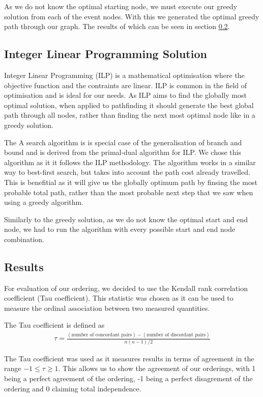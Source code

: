 \documentclass[bsc,frontabs,twoside,singlespacing,parskip,deptreport]{infthesis}     %
\begin{document}
As we do not know the optimal starting node, we must execute our greedy solution from each of the event nodes.
With this we generated the optimal greedy path through our graph. The results of which can be seen in section \ref{sec:graph-results}.

\subsection{Integer Linear Programming Solution}
Integer Linear Programming (ILP) is a mathematical optimisation where the objective function and the contraints are linear.
ILP is common in the field of optimisation and is ideal for our needs. As ILP aims to find the globally most optimal solution, when applied to pathfinding it
should generate the best global path through all nodes, rather than finding the next most optimal node like in a greedy solution.


The A\* search algorithm is is special case of the generalisation of branch and bound\cite{balas1983branch} and is derived from the primal-dual algorithm for ILP\cite{ye2012note}.
We chose this algorithm as it it follows the ILP methodology. The algorithm works in a similar way to best-first search, but takes into account the path cost already travelled.
This is benefitial as it will give us the globally optimum path by finsing the most probable total path, rather than the most probable next step that we saw when using a
greedy algorithm.

Similarly to the greedy solution, as we do not know the optimal start and end node, we had to run the algorithm with every possible start and end node combination.

\subsection{Results}\label{sec:graph-results}
For evaluation of our ordering, we decided to use the Kendall rank correlation coefficient (Tau coefficient).
This statistic was chosen as it can be used to measure the ordinal association between two measured quantities.


The Tau coefficient is defined as
\begin{eqnarray}
  \tau=\frac{(\text{number of concordant pairs})-(\text{number of discordant pairs})}{n(n-1)/2}\nonumber
\end{eqnarray}\cite{abdi2007kendall}

The Tau coefficient was used as it measures results in terms of agreement in the range $-1 \leq \tau \geq 1$.
This allows us to show the agreement of our orderings, with 1 being a perfect agreement of the ordering, -1 being a perfect disagrement of the ordering and 0 claiming
total independence.
\end{document}
